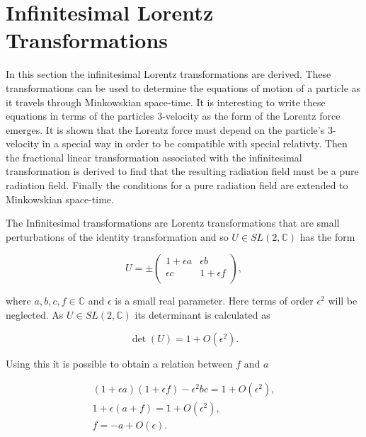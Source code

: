 \section{Infinitesimal Lorentz Transformations}

In this section the infinitesimal Lorentz transformations are derived. These transformations can be used to determine the equations of motion of a particle as it travels through Minkowskian space-time. It is interesting to write these equations in terms of the particles $3$-velocity as the form of the Lorentz force emerges. It is shown that the Lorentz force must depend on the particle's $3$-velocity in a special way in order to be compatible with special relativty. Then the fractional linear transformation associated with the infinitesimal transformation is derived to find that the resulting radiation field must be a pure radiation field. Finally the conditions for a pure radiation field are extended to Minkowskian space-time.

The Infinitesimal transformations are Lorentz transformations that are small perturbations of the identity transformation and so $U \in SL(2,\mathbb{C})$ has the form

\begin{equation}\label{Infinitesimal_Infinitesimal_Lorentz_Transform_Matrix_U}
U = \pm
\left(
\begin{array}{cc}
1 + \epsilon a & \epsilon b \\
\epsilon c & 1 + \epsilon f \\
\end{array}
\right),
\end{equation}

\noindent where $a,b,c,f \in \mathbb{C}$ and $\epsilon$ is a small real parameter. Here terms of order $\epsilon^2$ will be neglected. As $U \in SL(2,\mathbb{C})$ its determinant is calculated as

\begin{equation*}
\det{(U)} = 1 + O(\epsilon^2).
\end{equation*}

\noindent Using this it is possible to obtain a relation between $f$ and $a$

\begin{gather*}
(1 + \epsilon a)(1 + \epsilon f) - \epsilon^2 b c = 1 + O(\epsilon^2), \\
1 + \epsilon (a +f) = 1 + O(\epsilon^2), \\
f = -a + O(\epsilon).
\end{gather*}

